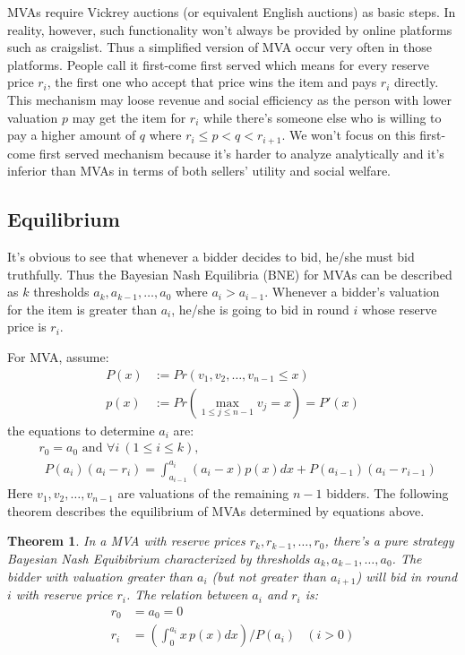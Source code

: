 \documentclass{aamas2012}
\newtheorem{theorem}{Theorem}
\begin{document}
MVAs require Vickrey auctions (or equivalent English auctions) as basic steps.
In reality, however, such functionality won't always be provided by online
platforms such as craigslist. Thus a simplified version of MVA occur very often
in those platforms. People call it first-come first served which means for
every reserve price $r_i$, the first one who accept that price wins the item
and pays $r_i$ directly. This mechanism may loose revenue and social efficiency
as the person with lower valuation $p$ may get the item for $r_i$ while there's
someone else who is willing to pay a higher amount of $q$ where $r_i \leq p < q
< r_{i+1}$. We won't focus on this first-come first served mechanism because
it's harder to analyze analytically and it's inferior than MVAs in terms of
both sellers' utility and social welfare.

\subsection{Equilibrium}

It's obvious to see that whenever a bidder decides to bid, he/she must bid
truthfully. Thus the Bayesian Nash Equilibria (BNE) for MVAs can be described
as $k$ thresholds $a_k, a_{k-1}, \ldots, a_0$ where $a_i > a_{i-1}$. Whenever
a bidder's valuation for the item is greater than $a_i$, he/she is going to bid
in round $i$ whose reserve price is $r_i$.

For MVA, assume:
\begin{align*}
    P(x) &:= Pr(v_{1},v_{2},\ldots,v_{n-1}\leq x)\\
    p(x) &:= Pr(\max_{1 \leq j\leq n-1}v_{j}=x)=P'(x)
\end{align*}
the equations to determine $a_i$ are: 
\begin{align}\label{eq:MVA_eq}
    &r_0 = a_0 \mbox{ and }
    \forall i ~(1 \leq i \leq k),\nonumber\\
    &~~P(a_{i})(a_{i}-r_i) =
    \int_{a_{i-1}}^{a_{i}}(a_{i}-x)p(x)dx+P(a_{i-1})(a_{i}-r_{i-1})
\end{align}
Here $v_1, v_2, \ldots, v_{n-1}$ are valuations of the remaining $n-1$ bidders.
The following theorem describes the equilibrium of MVAs determined by equations above.

\begin{theorem}
In a MVA with reserve prices $r_k, r_{k-1}, \ldots, r_0$, there's a pure
strategy Bayesian Nash Equibibrium characterized by thresholds $a_k, a_{k-1},
\ldots, a_0$.  The bidder with valuation greater than $a_i$ (but not greater
than $a_{i+1}$) will bid in round $i$ with reserve price $r_i$. The relation
between $a_i$ and $r_i$ is:
\begin{align}\label{eq:MVA_eq_relation}
  r_0 &= a_0 = 0 \nonumber \\
  r_i &= \left( \int_{0}^{a_i} x \, p(x) dx \right) / P(a_i) & (i > 0)
\end{align}
\end{theorem}
\end{document}
